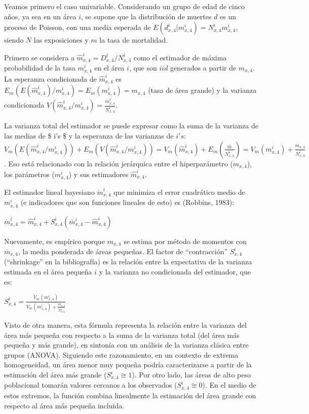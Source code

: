 \documentclass[12pt,]{article}
\begin{document}
Veamos primero el caso univariable. Considerando un grupo de edad de
cinco años, ya sea en un área \(i\), se supone que la distribución de
muertes \(d\) es un proceso de Poisson, con una media esperada de
\(E(d_ {x,4}^{i}|{m_{x,4}^{i}})=N_{x,4}^{i}m_{x,4}^{i}\), siendo \(N\)
las exposiciones y \(m\) la tasa de mortalidad.

Primero se considera a \(\hat{m}_{x,4}^{i}=D_{x,4}^{i}/N_{x,4}^{i}\)
como el estimador de máxima probabilidad de la tasa \(m_{x,4}^{i}\) en
el área \(i\), que son \(iid\) generados a partir de \(m_{x,4}\). La
esperanza condicionada de \(\hat{m}_{x,4}^{i}\) es
\(E_{m}(E({\hat{m}}_{x,4}^{i})/m_{x,4}^{i})=E_{m}({m_{x, 4}^{i}}) = m_{x,4}\)
(tasa de área grande) y la varianza condicionada
\(V({\hat{m}}_{x,4}^{i}/m_{x,4}^{i})=\frac{m_{x,4}^{i}}{N_{x,4}^{i}}\).

La varianza total del estimador se puede expresar como la suma de la
varianza de las medias de \$ i's \$ y la esperanza de las varianzas de
\(i's\):
\(V_{m}(E(\hat{m}_{x,4}^{i}/m_{x,4}^{i}))+E_{m}(V({\hat{m}}_{x,4}^ {i}/m_{x,4}^{i}))=V_{m}(\hat{m}_{x,4}^{i})+E_{m}(\frac{{\hat{m}}}{N_{x,4}^{i}})=V_{m}(m_{x,4}^{i})+\frac{m_{x, 4}}{N_{x,4}^{i}}\).
Eso está relacionado con la relación jerárquica entre el hiperparámetro
(\(m_{x, 4}\)), los parámetros (\(m_{x,4}^{i}\)) y sus estimadores
\(\hat{m}_{x,4}^{i}\).

El estimador lineal bayesiano \(\mathring{m}_{x, 4}^{i}\) que minimiza
el error cuadrático medio de \({m}_{x,4}^{i}\) (e indicadores que son
funciones lineales de esto) es (Robbins, 1983):

\(\mathring{m}_{x,4}^{i}=\hat{m}_{x, 4}^{i}+S_{x,4}^{i}(\bar{m}_{x,4}^{i}-\hat{m}_{x,4}^{i})\)

Nuevamente, es empírico porque \(m_{x,4}\) se estima por método de
momentos con \(\bar{m}_{x,4}\), la media ponderada de áreas pequeñas. El
factor de ``contracción'' \(S_{x, 4}^{i}\) (``shrinkage'' en la
bibliografía) es la relación entre la expectativa de la varianza
estimada en el área pequeña \(i\) y la varianza no condicionada del
estimador, que es:

\(S_{x,4}^{i}=\frac{V_{m}(m_{x,4}^{i})}{V_{m}(m_{x,4}^{i})+\frac{m_{x,4}}{N_{x,4}^{i}}}\)

Visto de otra manera, esta fórmula representa la relación entre la
varianza del área más pequeña con respecto a la suma de la varianza
total (del área más pequeña y más grande), en sintonía con un análisis
de la varianza clásica entre grupos (ANOVA). Siguiendo este
razonamiento, en un contexto de extrema homogeneidad, un área menor muy
pequeña podría caracterizarse a partir de la estimación del área más
grande (\(S_{x, 4} ^ {i} \cong 1\)). Por otro lado, las áreas de alto
peso poblacional tomarán valores cercanos a los observados
(\(S_{x,4}^{i}\cong 0\)). En el medio de estos extremos, la función
combina linealmente la estimación del área grande con respecto al área
más pequeña incluida.
\end{document}
